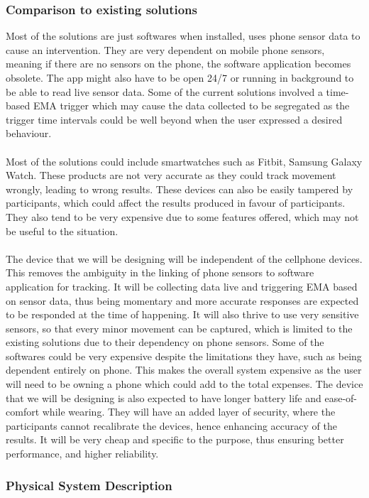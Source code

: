 \documentclass[12pt]{article}
\begin{document}
\subsubsection{Comparison to existing solutions}
Most of the solutions are just softwares when installed, uses phone sensor data to cause an intervention. They are very dependent on mobile phone sensors, meaning if there are no sensors on the phone, the software application becomes obsolete.
The app might also have to be open 24/7 or running in background to be able to read live sensor data.  Some of the current solutions involved a time-based EMA trigger
which may cause the data collected to be segregated as the trigger time intervals could be well beyond when the user expressed a desired behaviour.
\\\\
Most of the solutions could include smartwatches such as Fitbit, Samsung Galaxy Watch. These products are not very accurate as they could track movement wrongly, leading to wrong results.
These devices can also be easily tampered by participants, which could affect the results produced in favour of participants.
They also tend to be very expensive due to some features offered, which may not be useful to the situation.
\\\\
The device that we will be designing will be independent of the cellphone devices. This removes the ambiguity in the linking of phone sensors to software application for tracking. It will be collecting data live and triggering EMA based on sensor data, thus being momentary and
more accurate responses are expected to be responded at the time of happening. It will also thrive to use very sensitive sensors, so that every minor movement can be captured, which is limited to the existing solutions due to their dependency on phone sensors.
Some of the softwares could be very expensive despite the limitations they have, such as being dependent entirely on phone. This makes the overall system expensive as the user will need
to be owning a phone which could add to the total expenses. The device that we will be designing is also expected to have longer battery life and ease-of-comfort while wearing. They will have an added layer of security, where the participants cannot recalibrate the devices, hence enhancing accuracy of the results.
It will be very cheap and specific to the purpose, thus ensuring better performance, and higher reliability.
\subsubsection{Physical System Description} \label{sec_phySystDescrip}
\end{document}
